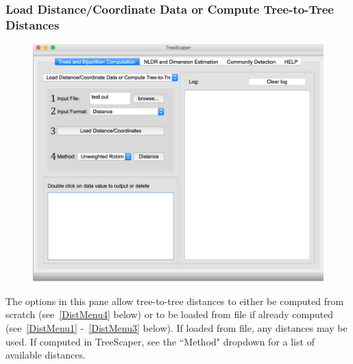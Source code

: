 \documentclass[11pt]{article}
\begin{document}
\newpage
\subsubsection{Load Distance/Coordinate Data or Compute Tree-to-Tree Distances}\label{subsubsect:LoadCompDist}

\begin{figure}[thbp!]\centering
\includegraphics[scale=0.4]{imagesForManual/Figure10_6_1_5.png}
\end{figure}

The options in this pane allow tree-to-tree distances to either be computed from scratch (see~\ref{DistMenu4} below) or to be loaded from file if already computed (see~\ref{DistMenu1} -~\ref{DistMenu3} below). If loaded from file, any
distances may be used. If computed in TreeScaper, see the ``Method" dropdown for a list of
available distances. \\
\end{document}
